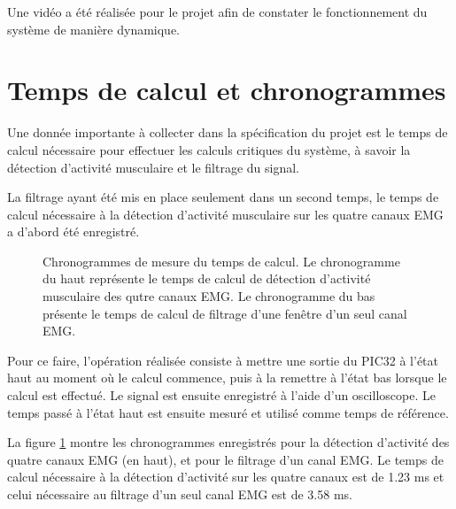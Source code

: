 \documentclass[letterpaper, twoside, 12pt, memoire, creativecommons, hyperref]{thETS}
\begin{document}
Une vidéo a été réalisée pour le projet afin de constater le fonctionnement du système de manière dynamique.

\section{Temps de calcul et chronogrammes}

Une donnée importante à collecter dans la spécification du projet est le temps de calcul nécessaire pour effectuer les calculs critiques du système, à savoir la détection d'activité musculaire et le filtrage du signal.

La filtrage ayant été mis en place seulement dans un second temps, le temps de calcul nécessaire à la détection d'activité musculaire sur les quatre canaux EMG a d'abord été enregistré. 

\begin{figure}
	\centering
	\caption{Chronogrammes de mesure du temps de calcul. Le chronogramme du haut représente le temps de calcul de détection d'activité musculaire des qutre canaux EMG. Le chronogramme du bas présente le temps de calcul de filtrage d'une fenêtre d'un seul canal EMG.}
	\label{fig:chronogrammes}
\end{figure}

Pour ce faire, l'opération réalisée consiste à mettre une sortie du PIC32 à l'état haut au moment où le calcul commence, puis à la remettre à l'état bas lorsque le calcul est effectué. Le signal est ensuite enregistré à l'aide d'un oscilloscope. Le temps passé à l'état haut est ensuite mesuré et utilisé comme temps de référence. 

La figure \ref{fig:chronogrammes} montre les chronogrammes enregistrés pour la détection d'activité des quatre canaux EMG (en haut), et pour le filtrage d'un canal EMG. Le temps de calcul nécessaire à la détection d'activité sur les quatre canaux est de 1.23 ms et celui nécessaire au filtrage d'un seul canal EMG est de 3.58 ms.
\end{document}
